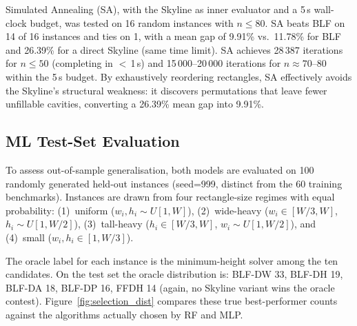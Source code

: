 \documentclass[11pt,a4paper]{article}
\begin{document}
Simulated Annealing (SA), with the Skyline as inner evaluator and a 5\,s
wall-clock budget, was tested on 16 random instances with $n \le 80$.
SA beats BLF on 14 of 16 instances and ties on 1, with a mean gap of 9.91\%
vs.\ 11.78\% for BLF and 26.39\% for a direct Skyline (same time limit).
SA achieves 28\,387 iterations for $n \le 50$ (completing in $<\,$1\,s) and
15\,000--20\,000 iterations for $n \approx 70$--80 within the 5\,s budget.
By exhaustively reordering rectangles, SA effectively avoids the Skyline's
structural weakness: it discovers permutations that leave fewer unfillable
cavities, converting a 26.39\% mean gap into 9.91\%.

\subsection{ML Test-Set Evaluation}

To assess out-of-sample generalisation, both models are evaluated on 100
randomly generated held-out instances (seed=999, distinct from the 60
training benchmarks).
Instances are drawn from four rectangle-size regimes with equal probability:
(1)~uniform ($w_i, h_i \sim U[1,W]$), (2)~wide-heavy ($w_i \in [W/3,W]$,
$h_i \sim U[1,W/2]$), (3)~tall-heavy ($h_i \in [W/3,W]$, $w_i \sim U[1,W/2]$),
and (4)~small ($w_i, h_i \in [1,W/3]$).

The oracle label for each instance is the minimum-height solver among the
ten candidates.
On the test set the oracle distribution is:
BLF-DW 33, BLF-DH 19, BLF-DA 18, BLF-DP 16, FFDH 14
(again, no Skyline variant wins the oracle contest).
Figure~\ref{fig:selection_dist} compares these true best-performer counts
against the algorithms actually chosen by RF and MLP.
\end{document}
